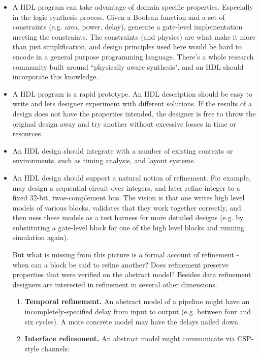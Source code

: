 \documentclass[10pt,twoside]{article}
\begin{document}
\begin{itemize}
\item A HDL program can take advantage of domain specific properties.
Especially in the logic synthesis process. Given a Boolean
function and a set of constraints (e.g. area, power, delay), generate a
gate-level implementation meeting the constraints. The constraints (and
physics) are what make it more than just simplification, and design
principles used here would be hard to encode in a general
purpose programming language.  There's a
whole research community built around ``physically aware synthesis",
and an HDL should incorporate this knowledge.

\item A HDL program is a rapid prototype. An HDL description should be
easy to write and lets designer experiment with different solutions. If
the results of a design does not have the properties intended, the
designer is free to throw the original design away and try another
without excessive losses in time or resources. 

\item An HDL design should integrate with a number of existing contexts
or environments, such as timing analysis, and layout systems. 

\item An HDL design should support a natural notion of refinement.
For example, 
may design a sequential circuit over integers, and later refine integer
to a fixed 32-bit, twos-complement bus. The vision is that one
writes high level models of various blocks, validates that they work
together correctly, and then uses these models as a test harness for more
detailed designs (e.g. by substituting a gate-level block for one of the
high level blocks and running simulation again).

But what is missing from this picture is a formal account of refinement -
when can a block be said to refine another? Does refinement preserve
properties that were verified on the abstract model?  Besides data
refinement designers are interested in refinement in several other dimensions.
\begin{enumerate}
 \item{\bf Temporal refinement.} An abstract model of a pipeline might have an
    incompletely-specified delay from input to output (e.g. between four
    and six cycles). A more concrete model may have the delays nailed
    down.
    
 \item{\bf Interface refinement.} An abstract model might communicate via
    CSP-style channels:\\


\end{enumerate}
\end{itemize}
\end{document}
